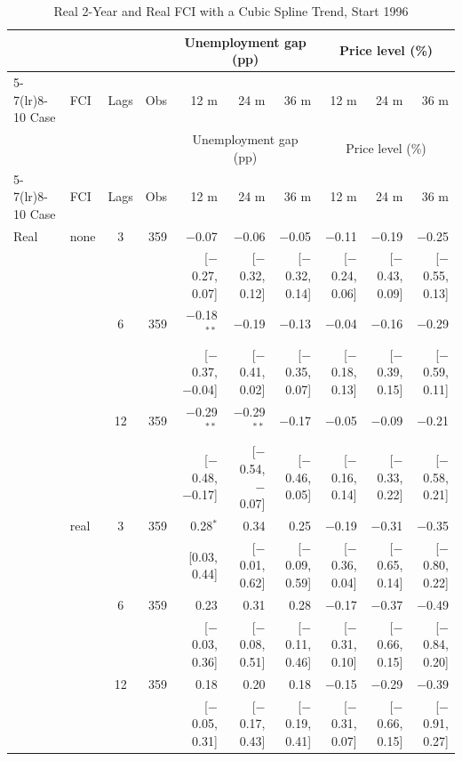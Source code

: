 \begingroup\scriptsize\setlength{\tabcolsep}{0.9pt}
\begin{longtable}{llcrrrrrrr}
\caption{Real 2-Year and Real FCI with a Cubic Spline Trend, Start 1996}\label{tab:appR2c}\\
\toprule
 & & & & \multicolumn{3}{c}{Unemployment gap (pp)} & \multicolumn{3}{c}{Price level (\%)}\\ \cmidrule(lr){5-7}\cmidrule(lr){8-10}
Case & FCI & Lags & Obs & 12 m & 24 m & 36 m & 12 m & 24 m & 36 m\\
\midrule\endfirsthead
\toprule
 & & & & \multicolumn{3}{c}{Unemployment gap (pp)} & \multicolumn{3}{c}{Price level (\%)}\\ \cmidrule(lr){5-7}\cmidrule(lr){8-10}
Case & FCI & Lags & Obs & 12 m & 24 m & 36 m & 12 m & 24 m & 36 m\\
\midrule\endhead
\bottomrule\endfoot
Real & none & 3 & 359 & $-$0.07 & $-$0.06 & $-$0.05 & $-$0.11 & $-$0.19 & $-$0.25\\
 & & & & {\scriptsize [$-$0.27, 0.07]} & {\scriptsize [$-$0.32, 0.12]} & {\scriptsize [$-$0.32, 0.14]} & {\scriptsize [$-$0.24, 0.06]} & {\scriptsize [$-$0.43, 0.09]} & {\scriptsize [$-$0.55, 0.13]}\\
 &  & 6 & 359 & $-$0.18$^{**}$ & $-$0.19 & $-$0.13 & $-$0.04 & $-$0.16 & $-$0.29\\
 & & & & {\scriptsize [$-$0.37, $-$0.04]} & {\scriptsize [$-$0.41, 0.02]} & {\scriptsize [$-$0.35, 0.07]} & {\scriptsize [$-$0.18, 0.13]} & {\scriptsize [$-$0.39, 0.15]} & {\scriptsize [$-$0.59, 0.11]}\\
 &  & 12 & 359 & $-$0.29$^{**}$ & $-$0.29$^{**}$ & $-$0.17 & $-$0.05 & $-$0.09 & $-$0.21\\
 & & & & {\scriptsize [$-$0.48, $-$0.17]} & {\scriptsize [$-$0.54, $-$0.07]} & {\scriptsize [$-$0.46, 0.05]} & {\scriptsize [$-$0.16, 0.14]} & {\scriptsize [$-$0.33, 0.22]} & {\scriptsize [$-$0.58, 0.21]}\\
 & real & 3 & 359 & 0.28$^{*}$ & 0.34 & 0.25 & $-$0.19 & $-$0.31 & $-$0.35\\
 & & & & {\scriptsize [0.03, 0.44]} & {\scriptsize [$-$0.01, 0.62]} & {\scriptsize [$-$0.09, 0.59]} & {\scriptsize [$-$0.36, 0.04]} & {\scriptsize [$-$0.65, 0.14]} & {\scriptsize [$-$0.80, 0.22]}\\
 &  & 6 & 359 & 0.23 & 0.31 & 0.28 & $-$0.17 & $-$0.37 & $-$0.49\\
 & & & & {\scriptsize [$-$0.03, 0.36]} & {\scriptsize [$-$0.08, 0.51]} & {\scriptsize [$-$0.11, 0.46]} & {\scriptsize [$-$0.31, 0.10]} & {\scriptsize [$-$0.66, 0.15]} & {\scriptsize [$-$0.84, 0.20]}\\
 &  & 12 & 359 & 0.18 & 0.20 & 0.18 & $-$0.15 & $-$0.29 & $-$0.39\\
 & & & & {\scriptsize [$-$0.05, 0.31]} & {\scriptsize [$-$0.17, 0.43]} & {\scriptsize [$-$0.19, 0.41]} & {\scriptsize [$-$0.31, 0.07]} & {\scriptsize [$-$0.66, 0.15]} & {\scriptsize [$-$0.91, 0.27]}\\
\end{longtable}
